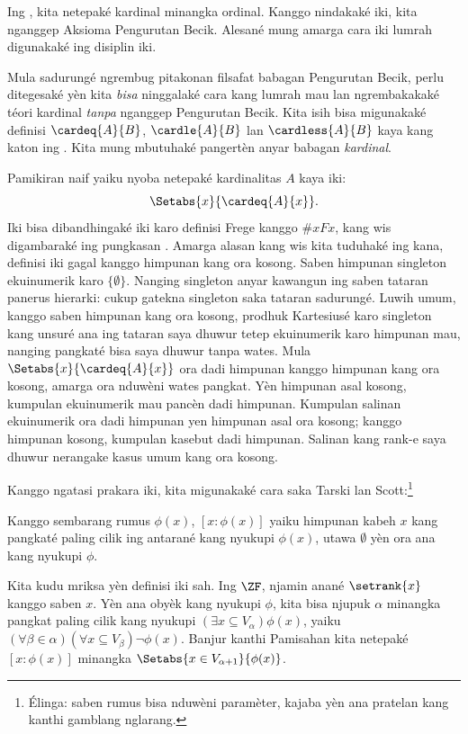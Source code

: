 \documentclass[../../../include/open-logic-section]{subfiles}
\begin{document}

Ing , kita
netepaké kardinal minangka ordinal. Kanggo nindakaké iki, kita
nganggep Aksioma Pengurutan Becik. Alesané mung amarga cara iki
lumrah digunakaké ing disiplin iki.

Mula sadurungé ngrembug pitakonan filsafat babagan Pengurutan Becik,
perlu ditegesaké yèn kita \emph{bisa} ninggalaké cara kang lumrah mau
lan ngrembakakaké téori kardinal \emph{tanpa} nganggep Pengurutan
Becik. Kita isih bisa migunakaké definisi $\cardeq{A}{B}$,
$\cardle{A}{B}$ lan $\cardless{A}{B}$ kaya kang katon ing
. Kita mung mbutuhaké pangertèn anyar babagan
\emph{kardinal}.

Pamikiran naif yaiku nyoba netepaké kardinalitas $A$ kaya iki:
\[
	\Setabs{x}{\cardeq{A}{x}}.
\]
Iki bisa dibandhingaké iki karo definisi Frege kanggo
$\# x Fx$, kang wis digambaraké ing pungkasan
. Amarga alasan kang wis kita tuduhaké ing
kana, definisi iki gagal kanggo himpunan kang ora kosong. Saben himpunan
singleton ekuinumerik karo $\{\emptyset\}$. Nanging singleton anyar
kawangun ing saben tataran panerus hierarki: cukup gatekna singleton
saka tataran sadurungé. Luwih umum, kanggo saben himpunan kang ora kosong,
prodhuk Kartesiusé karo singleton kang unsuré ana ing tataran saya dhuwur
tetep ekuinumerik karo himpunan mau, nanging pangkaté bisa saya dhuwur tanpa
wates. Mula $\Setabs{x}{\cardeq{A}{x}}$ ora dadi himpunan kanggo
himpunan kang ora kosong, amarga ora nduwèni wates pangkat. Yèn himpunan asal kosong,
kumpulan ekuinumerik mau pancèn dadi himpunan.
Kumpulan salinan ekuinumerik ora dadi himpunan yen himpunan asal ora kosong; kanggo himpunan kosong, kumpulan kasebut dadi himpunan. Salinan kang rank-e saya dhuwur nerangake kasus umum kang ora kosong.

Kanggo ngatasi prakara iki, kita migunakaké cara saka Tarski lan Scott:\footnote{Élinga: saben rumus bisa nduwèni paramèter, kajaba yèn ana pratelan kang kanthi gamblang nglarang.}

\begin{defn}
Kanggo sembarang rumus $\phi(x)$, $[ x : \phi(x)] $ yaiku himpunan
kabeh $x$ kang pangkaté paling cilik ing antarané kang nyukupi
$\phi(x)$, utawa $\emptyset$ yèn ora ana kang nyukupi $\phi$.
\end{defn}

Kita kudu mriksa yèn definisi iki sah. Ing $\ZF$,
 njamin anané
$\setrank{x}$ kanggo saben $x$. Yèn ana obyèk kang nyukupi
$\phi$, kita bisa njupuk $\alpha$ minangka pangkat paling cilik
kang nyukupi $(\exists x\subseteq V_\alpha)\phi(x)$, yaiku
$(\forall \beta \in \alpha)(\forall x \subseteq V_\beta)\lnot \phi(x)$.
Banjur kanthi Pamisahan kita netepaké $[x : \phi(x)]$ minangka
$\Setabs{x \in V_{\alpha+1}}{\phi(x)}$.
\end{document}
